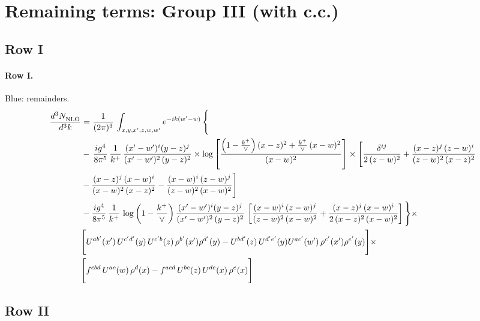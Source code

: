 \documentclass[10pt]{article}
\numberwithin{equation}{section}
\newcommand{\new}[1]{{\color{blue}#1}}
\begin{document}
\section{Remaining terms: Group III (with c.c.)}\label{sec:FgIII}
\subsection{Row I}
\paragraph{Row I.}
\new{Blue}: remainders.
\begin{align}
     \frac{d^{3}N_{\rm NLO}^{\rm}}{d^{3}k}  & =   \frac{1}{(2\pi)^{3}}\, \int_{x,y,x',z,w,w^{\prime}} e^{-ik(w^{\prime}-w)}\, \Bigg\{\notag \\
& -\,\frac{ig^{4}}{8\pi^{5}}\,\frac{1}{k^{+}}\,\frac{(x'-w')^{i}(y-z)^{j}}{(x'-w')^{2}\,(y-z)^{2}}\times \log{\left[\frac{\left(1-\frac{k^{+}}{\vee}\right)(x-z)^{2}+\frac{k^{+}}{\vee}\,(x-w)^{2}}{(x-w)^{2}}\right]}\times \Bigg[\frac{\delta^{ij}}{2\,(z-w)^{2}}+\frac{(x-z)^{j}\,(z-w)^{i}}{(z-w)^{2}\,(x-z)^{2}}\notag \\ & -\frac{(x-z)^{j}\,(x-w)^{i}}{(x-w)^{2}\,(x-z)^{2}}-\frac{(x-w)^{i}\,(z-w)^{j}}{(z-w)^{2}\,(x-w)^{2}}\Bigg] \notag \\
& -\frac{ig^{4}}{8\pi^{5}}\,\frac{1}{k^{+}}\,\log{\left(1-\frac{k^{+}}{\vee}\right)}\,\frac{(x'-w')^{i}(y-z)^{j}}{(x'-w')^{2}\,(y-z)^{2}}\,\left[\frac{(x-w)^{i}\,(z-w)^{j}}{(z-w)^{2}\,(x-w)^{2}}+\frac{(x-z)^{j}\,(x-w)^{i}}{2\,(x-z)^{2}\, (x-w)^{2}}\right]\Bigg\}\times \notag \\ &  \Bigg[U^{ab'}(x')\,U^{c'd'}(y)\,U^{c'b}(z)\,\rho^{b'}(x')\rho^{d'}(y)-U^{bd'}(z)\,U^{d'e'}(y)U^{ac'}(w')\,\rho^{c'}(x')\rho^{e'}(y)\Bigg]\times\notag \\ & \Bigg[f^{cbd}\,U^{ac}(w)\,\rho^{d}(x)-f^{acd}\, U^{bc}(z)\,U^{de}(x)\,\rho^{e}(x)\Bigg] \label{eq:F:G3I}
\end{align}

\subsection{Row II}
\end{document}
